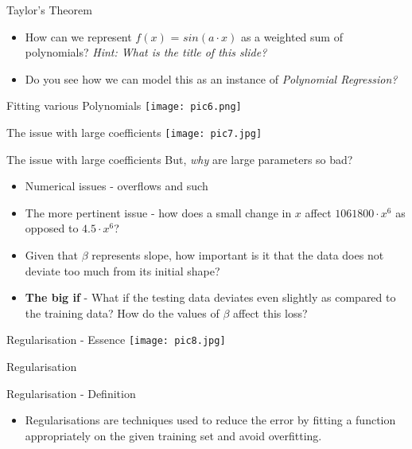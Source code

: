 \documentclass{beamer}
\begin{document}
\begin{frame}{Taylor's Theorem}
    \begin{itemize}
        \item How can we represent $f(x)$ = $sin(a \cdot x)$ as a weighted sum of polynomials? \textit{Hint: What is the title of this slide?}
        \item Do you see how we can model this as an instance of \textit{Polynomial Regression?}
    \end{itemize}
\end{frame}

\begin{frame}{Fitting various Polynomials}
\texttt{[image: pic6.png]}
\end{frame}

\begin{frame}{The issue with large coefficients}
    \texttt{[image: pic7.jpg]}
\end{frame}

\begin{frame}{The issue with large coefficients}
    But, \textit{why} are large parameters so bad?
    \begin{itemize}
        \item Numerical issues - overflows and such 
        \item The more pertinent issue - how does a small change in $x$ affect $1061800 \cdot x^6$ as opposed to $4.5 \cdot x^6$?
        \item Given that $\beta$ represents slope, how important is it that the data does not deviate too much from its initial shape?
        \item \textbf{The big if} - What if the testing data deviates even slightly as compared to the training data? How do the values of $\beta$ affect this loss?
    \end{itemize}
\end{frame}

\begin{frame}{Regularisation - Essence}
    \texttt{[image: pic8.jpg]}
\end{frame}

\begin{frame}
    Regularisation
\end{frame}

\begin{frame}{Regularisation - Definition}
    \begin{itemize}
        \item Regularisations are techniques used to reduce the error by fitting a function appropriately on the given training set and avoid overfitting.
    \end{itemize}
\end{frame}
\end{document}
